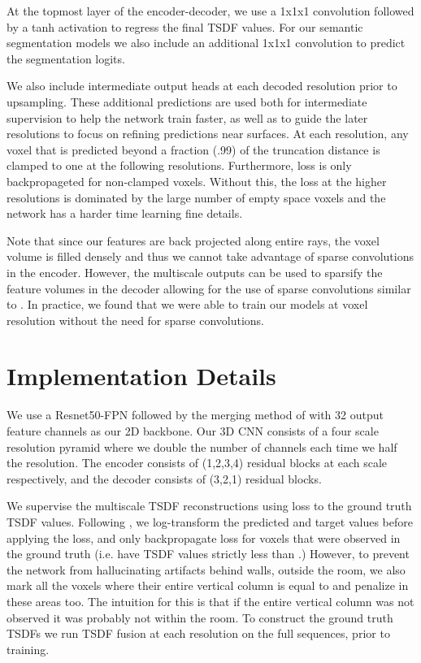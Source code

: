 \documentclass[runningheads]{llncs}
\begin{document}
At the topmost layer of the encoder-decoder, we use a 1x1x1 convolution followed by a tanh activation to regress the final TSDF values.
For our semantic segmentation models we also include an additional 1x1x1 convolution to predict the segmentation logits.

We also include intermediate output heads at each decoded resolution prior to upsampling.
These additional predictions are used both for intermediate supervision to help the network train faster,
as well as to guide the later resolutions to focus on refining predictions near surfaces.
At each resolution, any voxel that is predicted beyond a fraction (.99) of the truncation distance
is clamped to one at the following resolutions.
Furthermore, loss is only backpropageted for non-clamped voxels.
Without this, the loss at the higher resolutions is dominated by the large number of empty space voxels
and the network has a harder time learning fine details.

Note that since our features are back projected along entire rays, the voxel volume is filled densely and thus we cannot take advantage of sparse convolutions\cite{graham20183d} in the encoder.
However, the multiscale outputs can be used to sparsify the feature volumes in the decoder allowing for the use of sparse convolutions similar to \cite{dai2019sg}.
In practice, we found that we were able to train our models at  voxel resolution without the need for sparse convolutions.






\section{Implementation Details}




We use a Resnet50-FPN\cite{lin2017feature} followed by the merging method of \cite{kirillov2019panoptic} with 32 output feature channels as our 2D backbone.
Our 3D CNN consists of a four scale resolution pyramid where we double the number of channels each time we half the resolution.
The encoder consists of (1,2,3,4) residual blocks at each scale respectively, and the decoder consists of (3,2,1) residual blocks.

We supervise the multiscale TSDF reconstructions using  loss to the ground truth TSDF values.
Following \cite{dai2016shape}, we log-transform the predicted and target values before applying the  loss, 
and only backpropagate loss for voxels that were observed in the ground truth (i.e. have TSDF values strictly less than .)
However, to prevent the network from hallucinating artifacts behind walls, outside the room, we also mark all the voxels where their entire vertical column is equal to  and penalize in these areas too.
The intuition for this is that if the entire vertical column was not observed it was probably not within the room.
To construct the ground truth TSDFs we run TSDF fusion at each resolution on the full sequences, prior to training.
\end{document}
